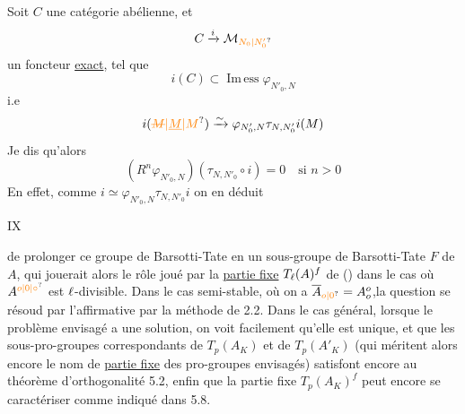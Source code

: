 

Soit $C$ une catégorie abélienne,  et
\[
C\xrightarrow{i}\mathcal M_{\unsure{N_0|N'_0}}
\]
un foncteur \uline{exact}, tel que
\[
i(C)\subset\operatorname{Im\,ess}\varphi_{N'_0,N}
\]
i.e
\[
i(\unsure{\deleted{M}|\underline M|M})\xrightarrow{\sim}\varphi_{N'_0,N}\tau_{N,N'_0}i(M)
\]
Je dis qu'alors
\[
(R^n\varphi_{N'_0,N})(\tau_{N,N'_0}\circ i)=0\quad\text{si }n>0
\]
En effet, comme $i\simeq\varphi_{N'_0,N}\tau_{N,N'_0}i$ on en déduit

\hfill IX

de prolonger ce groupe de Barsotti-Tate en un sous-groupe de Barsotti-Tate $F$ de $A$, qui jouerait alors le rôle joué par la \uline{partie fixe} $T_{\ell}(A)^f$ de () dans le cas où $A^{\unsure{o|0|\circ}}$ est $\ell$-divisible. Dans le cas semi-stable, où on a $\overline A_{\unsure{o|0}}=A_o^o$,la question se résoud par l'affirmative par la méthode de 2.2. Dans le cas général, lorsque le problème envisagé a une solution, on voit facilement qu'elle est unique, et que les sous-pro-groupes correspondants de $T_p(A_K)$ et de $T_p(A'_K)$ (qui méritent alors encore le nom de \uline{partie fixe} des pro-groupes envisagés) satisfont encore au théorème d'orthogonalité 5.2, enfin que la partie fixe $T_p(A_K)^f$ peut encore se caractériser comme indiqué dans 5.8.


